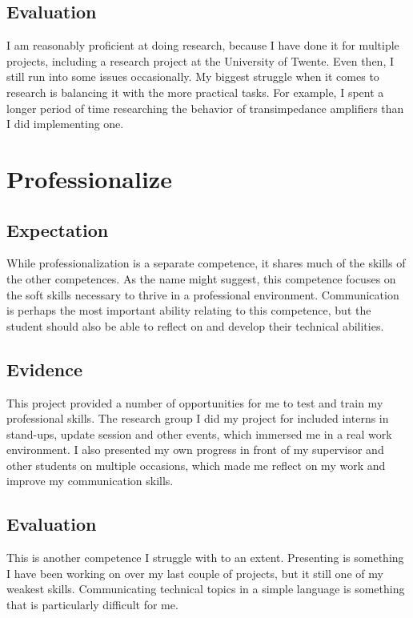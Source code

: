 \documentclass{report}
\begin{document}
\subsection{Evaluation}
I am reasonably proficient at doing research, because I have done it for multiple projects, including a research project at the University of Twente. Even then, I still run into some issues occasionally. My biggest struggle when it comes to research is balancing it with the more practical tasks. For example, I spent a longer period of time researching the behavior of transimpedance amplifiers than I did implementing one.


\section{Professionalize}

\subsection{Expectation}
While professionalization is a separate competence, it shares much of the skills of the other competences. As the name might suggest, this competence focuses on the soft skills necessary to thrive in a professional environment. Communication is perhaps the most important ability relating to this competence, but the student should also be able to reflect on and develop their technical abilities.

\subsection{Evidence}
This project provided a number of opportunities for me to test and train my professional skills. The research group I did my project for included interns in stand-ups, update session and other events, which immersed me in a real work environment. I also presented my own progress in front of my supervisor and other students on multiple occasions, which made me reflect on my work and improve my communication skills.

\subsection{Evaluation}
This is another competence I struggle with to an extent. Presenting is something I have been working on over my last couple of projects, but it still one of my weakest skills. Communicating technical topics in a simple language is something that is particularly difficult for me. 
\end{document}
